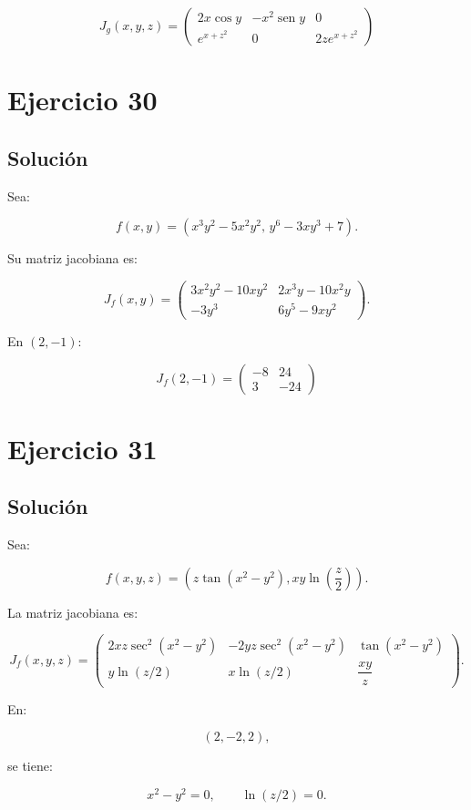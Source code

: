 \documentclass[11pt,a4paper]{article}
\newcommand{\sen}{\operatorname{sen}}
\begin{document}
\[
\boxed{
J_g(x,y,z)
=
\begin{pmatrix}
2x\cos y&-x^2\sen y&0\\
e^{x+z^2}&0&2ze^{x+z^2}
\end{pmatrix}
}
\]

\section{Ejercicio 30}
\subsection{Solución}

Sea:

\[
f(x,y)
=
\left(
x^3y^2-5x^2y^2,\,
y^6-3xy^3+7
\right).
\]

Su matriz jacobiana es:

\[
J_f(x,y)
=
\begin{pmatrix}
3x^2y^2-10xy^2&
2x^3y-10x^2y\\
-3y^3&
6y^5-9xy^2
\end{pmatrix}.
\]

En \((2,-1)\):

\[
\boxed{
J_f(2,-1)
=
\begin{pmatrix}
-8&24\\
3&-24
\end{pmatrix}
}
\]

\section{Ejercicio 31}
\subsection{Solución}

Sea:

\[
f(x,y,z)
=
\left(
z\tan(x^2-y^2),
xy\ln\left(\frac z2\right)
\right).
\]

La matriz jacobiana es:

\[
J_f(x,y,z)
=
\begin{pmatrix}
2xz\sec^2(x^2-y^2)&
-2yz\sec^2(x^2-y^2)&
\tan(x^2-y^2)\\[1mm]
y\ln(z/2)&
x\ln(z/2)&
\dfrac{xy}{z}
\end{pmatrix}.
\]

En:

\[
(2,-2,2),
\]

se tiene:

\[
x^2-y^2=0,
\qquad
\ln(z/2)=0.
\]
\end{document}
